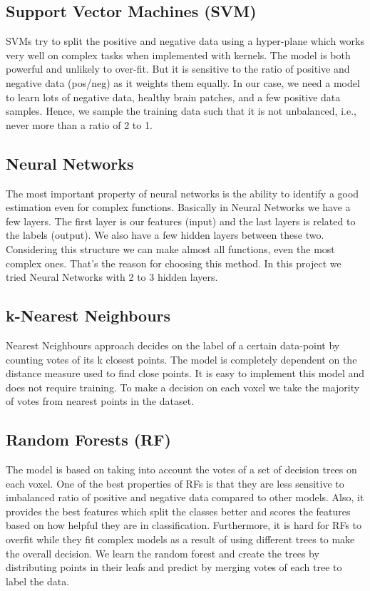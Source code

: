 \documentclass{article} %
\begin{document}
\subsection{Support Vector Machines (SVM)} 
SVMs try to split the positive and negative data using a hyper-plane which works very well on complex tasks when implemented with kernels. The model is both powerful and unlikely to over-fit. But it is sensitive to the ratio of positive and negative data (pos/neg) as it weights them equally. In our case, we need a model to learn lots of negative data, healthy brain patches, and a few positive data samples. Hence, we sample the training data such that it is not unbalanced, i.e., never more than a ratio of 2 to 1.

\subsection{ Neural Networks} 
The most important property of neural networks is the ability to identify a good estimation even for complex functions. Basically in Neural Networks we have a few layers. The first layer is our features (input) and the last layers is related to the labels (output). We also have a few hidden layers between these two. Considering this structure we can make almost all functions, even the most complex ones. That’s the reason for choosing this method. In this project we tried Neural Networks with 2 to 3 hidden layers.

\subsection{k-Nearest Neighbours} 
Nearest Neighbours approach decides on the label of a certain data-point by counting votes of its k closest points. The model is completely dependent on the distance measure used to find close points. It is easy to implement this model and does not require training. To make a decision on each voxel we take the majority of votes from nearest points in the dataset. 

\subsection{Random Forests (RF)} 
The model is based on taking into account the votes of a set of decision trees on each voxel. One of the best properties of RFs is that they are less sensitive to imbalanced ratio of positive and negative data compared to other models. Also, it provides the best features which split the classes better and scores the features based on how helpful they are in classification. Furthermore, it is hard for RFs to overfit while they fit complex models as a result of using different trees to make the overall decision. We learn the random forest and create the trees by distributing points in their leafs and predict by merging votes of each tree to label the data.
\end{document}
